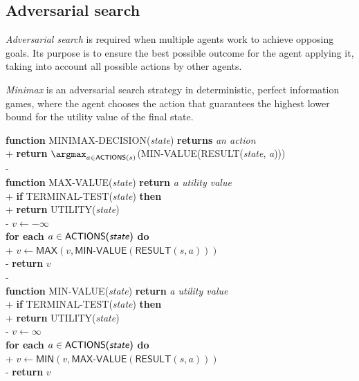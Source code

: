 \documentclass{article}
\begin{document}
\subsection{Adversarial search}


\begin{definition}[R\&N p. 161]
    \emph{Adversarial search} is required when multiple agents work to achieve 
    opposing goals. Its purpose is to ensure the best possible outcome for the
    agent applying it, taking into account all possible actions by other agents.
\end{definition}

\begin{definition}[R\&N p. 165]
    \emph{Minimax} is an adversarial search strategy in deterministic, perfect
    information games, where the agent chooses the action that guarantees the
    highest lower bound for the utility value of the final state.

    \begin{pseudo}
        \textbf{function} MINIMAX-DECISION(\emph{state}) \textbf{returns} \emph{an action}\\+
            \textbf{return} $\argmax_{a\in\textsf{ACTIONS}(s)}$(MIN-VALUE(RESULT(\emph{state}, \emph{a})))\\-
        \\
        \textbf{function} MAX-VALUE(\emph{state}) \textbf{return} \emph{a utility value}\\+
            \textbf{if} TERMINAL-TEST(\emph{state}) \textbf{then}\\+
                \textbf{return} UTILITY(\emph{state})\\-
            $v\leftarrow-\infty$\\
            \textbf{for each} $a\in\textsf{ACTIONS(\emph{state})}$ \textbf{do}\\+
                $v\leftarrow \textsf{MAX}(v, \textsf{MIN-VALUE}(\textsf{RESULT}(s, a)))$\\-
            \textbf{return} $v$\\-
        \\
        \textbf{function} MIN-VALUE(\emph{state}) \textbf{return} \emph{a utility value}\\+
            \textbf{if} TERMINAL-TEST(\emph{state}) \textbf{then}\\+
                \textbf{return} UTILITY(\emph{state})\\-
            $v\leftarrow\infty$\\
            \textbf{for each} $a\in\textsf{ACTIONS(\emph{state})}$ \textbf{do}\\+
                $v\leftarrow \textsf{MIN}(v, \textsf{MAX-VALUE}(\textsf{RESULT}(s, a)))$\\-
            \textbf{return} $v$
    \end{pseudo}
\end{definition}
\end{document}
